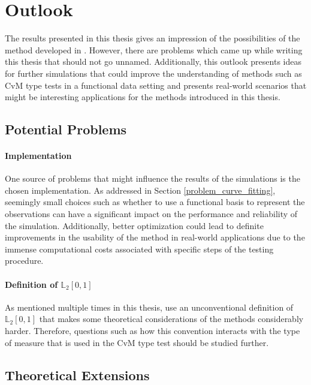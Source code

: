 \documentclass[12pt, a4paper]{article}
\theoremstyle{MAstyle} \newtheorem{assumption}{Assumption}[section]
\theoremstyle{MAstyle} \newtheorem{definition}{Definition}[section]
\theoremstyle{MAstyle} \newtheorem{theorem}{Theorem}[section]
\begin{document}
	\section{Outlook}\label{Outlook}
		The results presented in this thesis gives an impression of the possibilities of the method developed in \cite{bugni_permutation_2021}. 
		However, there are problems which came up while writing this thesis that should not go unnamed. Additionally, this outlook presents ideas for further simulations that could improve the understanding of methods such as CvM type tests in a functional data setting and presents real-world scenarios that might be interesting applications for the methods introduced in this thesis.
		
		\subsection{Potential Problems}
			
			
			\paragraph{Implementation\\}
				One source of problems that might influence the results of the simulations is the chosen implementation. As addressed in Section \ref{problem_curve_fitting}, seemingly small choices such as whether to use a functional basis to represent the observations can have a significant impact on the performance and reliability of the simulation. Additionally, better optimization could lead to definite improvements in the usability of the method in real-world applications due to the immense computational costs associated with specific steps of the testing procedure.
				
			\paragraph{Definition of $\mathbb{L}_2[0,1]$ \\}
				As mentioned multiple times in this thesis, \cite{bugni_permutation_2021} use an unconventional definition of $\mathbb{L}_2[0,1]$ that makes some theoretical considerations of the methods considerably harder. Therefore, questions such as how this convention interacts with the type of measure that is used in the CvM type test should be studied further. 
	
		\subsection{Theoretical Extensions}
\end{document}

